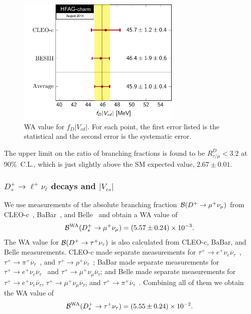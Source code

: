 \begin{figure}[hbt!]
\centering
\includegraphics[width=0.7\textwidth]{figures/charm/fDVcd.pdf}
\caption{
WA value for $f_{D}|V_{cd}|$. For each point, the first error listed is the statistical and the second error is the systematic error.
\label{fig:ExpDLeptonic}
}
\end{figure}
 
The upper limit on the ratio of branching fractions is found to be $R_{\tau/\mu}^D<3.2$ at 90\%~C.L., which is just slightly above the SM expected value, $2.67\pm0.01$.

\subsubsection{$D_s^+\to \ell^+\nu_{\ell}$ decays and $|V_{cs}|$}

We use measurements of the absolute branching fraction ${\cal B}(D^+\to\mu^+\nu_{\mu})$ from CLEO-c~\cite{Alexander:2009ux}, BaBar~\cite{delAmoSanchez:2010jg},
and Belle~\cite{Zupanc:2013byn} and obtain a WA value of
\[
 {\cal B}^{\rm WA}(D_{s}^+\to\mu^+\nu_{\mu}) = (5.57\pm0.24)\times10^{-3}.
\]
The WA value for ${\cal B}(D^+\to\tau^+\nu_{\tau})$ is also calculated from CLEO-c, BaBar, and Belle measurements. 
CLEO-c made separate measurements for $\tau^+\to e^+\nu_e\overline{\nu}{}_{\tau}$~\cite{Naik:2009tk},
$\tau^+\to\pi^+\overline{\nu}{}_{\tau}$~\cite{Alexander:2009ux}, and
$\tau^+\to\rho^+\overline{\nu}{}_{\tau}$~\cite{Onyisi:2009th};
BaBar made separate measurements for 
$\tau^+\to e^+\nu_e\overline{\nu}{}_{\tau}$~\cite{delAmoSanchez:2010jg} and $\tau^+\to \mu^+\nu_{\mu}\overline{\nu}{}_{\tau}$; and
Belle made separate measurements for $\tau^+\to e^+\nu_e\overline{\nu}{}_{\tau}$, $\tau^+\to \mu^+\nu_{\mu}\overline{\nu}{}_{\tau}$, 
and $\tau^+\to\pi^+\overline{\nu}{}_{\tau}$~\cite{Zupanc:2013byn}.
Combining all of them we obtain the WA value of
\[
 {\cal B}^{\rm WA}(D_{s}^+\to\tau^+\nu_{\tau}) = (5.55\pm0.24)\times10^{-2}.
\]

